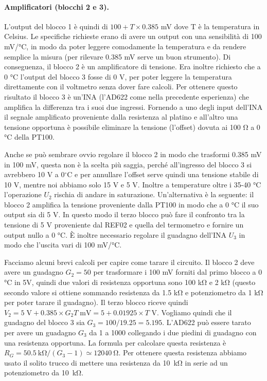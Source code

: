 \paragraph{Amplificatori (blocchi 2 e 3).}

L'output del blocco 1 è quindi di $100 + T\times0.385$ mV dove T è la temperatura in Celsius.
Le specifiche richieste erano di avere un output con una sensibilità di 100 mV/\si{\celsius}, 
in modo da poter leggere comodamente la temperatura e da rendere semplice la misura (per rilevare
0.385 mV serve un buon strumento). Di conseguenza, il blocco 2 è un amplificatore di tensione.
Era inoltre richiesto che a 0 \si{\celsius} l'output del blocco 3 fosse di 0 V, per poter leggere
la temperatura direttamente con il voltmetro senza dover fare calcoli. Per ottenere
questo risultato il blocco 3 è un'INA (l'AD622 come nella precedente esperienza) che amplifica
la differenza tra i suoi due ingressi. Fornendo a uno degli input dell'INA il segnale amplificato proveniente
dalla resistenza al platino e all'altro una tensione opportuna è possibile eliminare la tensione
(l'offset) dovuta ai 100 \si{\ohm} a 0 \si{\celsius} della PT100.

Anche se può sembrare ovvio regolare il blocco 2 in modo che trasformi 0.385 mV in 100 mV, questa
non è la scelta più saggia, perché all'ingresso del blocco 3 si avrebbero 10 V a 0$^\circ$C e per annullare l'offset
serve quindi una tensione stabile di 10 V, mentre noi abbiamo solo 15 V e 5 V. Inoltre a temperature oltre i 35-40 \si{\celsius}
l'operazione $U_2$ rischia di andare in saturazione. Un'alternativa è la seguente:
il blocco 2 amplifica la tensione proveniente dalla PT100 in modo che a 0 \si{\celsius} il suo output sia
di 5 V. In questo modo il terzo blocco può fare il confronto tra la tensione di 5 V proveniente dal REF02 e quella
del termometro e fornire un output nullo a 0 \si{\celsius}. È inoltre necessario regolare il guadagno dell'INA $U_3$
in modo che l'uscita vari di 100 mV/\si{\celsius}.

Facciamo alcuni brevi calcoli per capire come tarare il circuito. Il blocco 2 deve avere un guadagno $G_2 = 50$
per trasformare i 100 mV forniti dal primo blocco a 0 \si{\celsius} in 5V, quindi due valori di resistenza opportuna
sono 100 \si{\kilo\ohm} e 2 \si{\kilo\ohm} (questo secondo valore si ottiene sommando resistenza da 1.5 \si{\kilo\ohm}
e potenziometro da 1 \si{\kilo\ohm} per poter tarare il guadagno). Il terzo blocco riceve quindi
$V_2 = 5 \;\si{\volt} + 0.385 \times G_2T\; \si{\milli\volt} = 5 + 0.01925 \times T$ V.
Vogliamo quindi che il guadagno del blocco 3 sia $G_3 = 100/19.25 = 5.195$. L'AD622 può essere tarato per avere
un guadagno $G_3$ da 1 a 1000 collegando i due piedini di guadagno con una resistenza opportuna. La formula per
calcolare questa resistenza è $R_G = \SI{50.5}{\kilo\ohm}/(G_3 - 1) \simeq \SI{12040}{\ohm}$. Per ottenere questa
resistenza abbiamo usato il solito trucco di mettere una resistenza da \SI{10}{\kilo\ohm} in serie ad un potenziometro
da \SI{10}{\kilo\ohm}.

